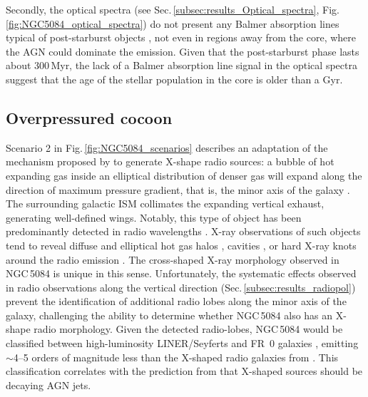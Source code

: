\documentclass[modern]{CORE-AAS/aastex631}
\begin{document}
Secondly, the optical spectra (see Sec.\,\ref{subsec:results_Optical_spectra}, Fig.\,\ref{fig:NGC5084_optical_spectra}) do not present any Balmer absorption lines typical of post-starburst objects \citep[also called E+A or K+A galaxies,][]{dressler+1983apj270_7}, not even in regions away from the core, where the AGN could dominate the emission. Given that the post-starburst phase lasts about 300\,Myr, the lack of a Balmer absorption line signal in the optical spectra suggest that the age of the stellar population in the core is older than a Gyr. 
\subsection{Overpressured cocoon}
\label{subsec:discussion_cocoon}
Scenario 2 in Fig.\,\ref{fig:NGC5084_scenarios} describes an adaptation of the mechanism proposed by \citet{capetti+2002aap394_39} to generate X-shape radio sources: a bubble of hot expanding gas inside an elliptical distribution of denser gas will expand along the direction of maximum pressure gradient, that is, the minor axis of the galaxy  \citep{blandford+1974mnras169_395}. The surrounding galactic ISM collimates the expanding vertical exhaust, generating well-defined wings. Notably, this type of object has been predominantly detected in radio wavelengths \citep[X-shaped radio galaxies,][]{hodgeskluck2011thesis, giri+2024sci11_1371101}.  X-ray observations of such objects tend to reveal diffuse and elliptical hot gas halos \citep{hodgeskluck+2010apj710_1205}, cavities \citep{hodgeskluck+2010apj717_37}, or hard X-ray knots around the radio emission \citep{hodgeskluck+2012apj746_167}. The cross-shaped X-ray morphology observed in NGC\,5084 is unique in this sense. 
Unfortunately, the systematic effects observed in radio observations along the vertical direction (Sec.\,\ref{subsec:results_radiopol}) prevent the identification of additional radio lobes along the minor axis of the galaxy, challenging the ability to determine whether NGC\,5084 also has an X-shape radio morphology. Given the detected radio-lobes, NGC\,5084 would be classified between high-luminosity LINER/Seyferts and FR~0 galaxies \citep[see Table \ref{tab:Radio_Lobes},][]{baldi2023aap31_3}, emitting $\sim$4--5 orders of magnitude less than the X-shaped radio galaxies from \citet{cheung+2009apj181_548}. This classification correlates with the prediction from \citet{hodgeskluck2011thesis} that X-shaped sources should be decaying AGN jets. 
\end{document}
